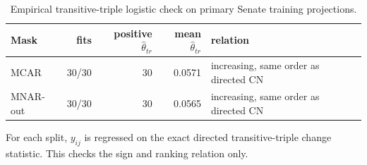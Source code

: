 \begin{table}[tbp]
\centering
\caption{Empirical transitive-triple logistic check on primary Senate training projections.}
\label{tab:mtt-check}
\begin{tabular}{lrrrl}
\toprule
Mask & fits & positive $\hat\theta_{tr}$ & mean $\hat\theta_{tr}$ & relation \\
\midrule
MCAR & 30/30 & 30 & 0.0571 & increasing, same order as directed CN \\
MNAR-out & 30/30 & 30 & 0.0565 & increasing, same order as directed CN \\
\bottomrule
\end{tabular}
\par\vspace{2pt}\footnotesize For each split, $y_{ij}$ is regressed on the exact directed transitive-triple change statistic. This checks the sign and ranking relation only.
\end{table}
